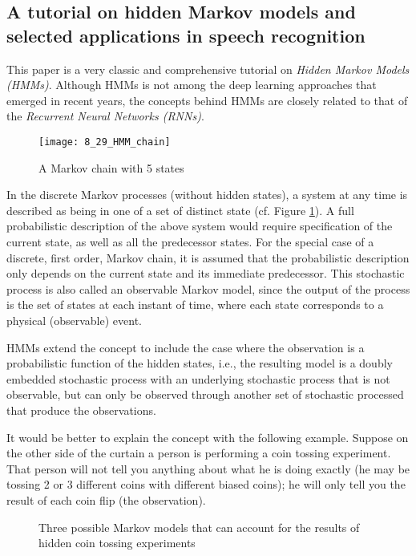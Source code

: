 \subsection{A tutorial on hidden Markov models and selected applications in speech recognition \cite{Rabiner1989A}}

This paper is a very classic and comprehensive tutorial on \emph{Hidden Markov Models (HMMs)}. Although HMMs is not among the deep learning approaches that emerged in recent years, the concepts behind HMMs are closely related to that of the \emph{Recurrent Neural Networks (RNNs)}.

\begin{figure}[htbp]
  \centering
  \texttt{[image: 8\_29\_HMM\_chain]}\\
  \caption{A Markov chain with 5 states}\label{fig:chain}
\end{figure}

In the discrete Markov processes (without hidden states), a system at any time is described as being in one of a set of distinct state (cf. Figure \ref{fig:chain}). A full probabilistic description of the above system would require specification of the current state, as well as all the predecessor states. For the special case of a discrete, first order, Markov chain, it is assumed that the probabilistic description only depends on the current state and its immediate predecessor. This stochastic process is also called an observable Markov model, since the output of the process is the set of states at each instant of time, where each state corresponds to a physical (observable) event.

HMMs extend the concept to include the case where the observation is a probabilistic function of the hidden states, i.e., the resulting model is a doubly embedded stochastic process with an underlying stochastic process that is not observable, but can only be observed through another set of stochastic processed that produce the observations.

It would be better to explain the concept with the following example. Suppose on the other side of the curtain a person is performing a coin tossing experiment. That person will not tell you anything about what he is doing exactly (he may be tossing 2 or 3 different coins with different biased coins); he will only tell you the result of each coin flip (the observation).

\begin{figure}[htbp]
  \centering
  \caption{Three possible Markov models that can account for the results of hidden coin tossing experiments}\label{fig:coin}
\end{figure}

